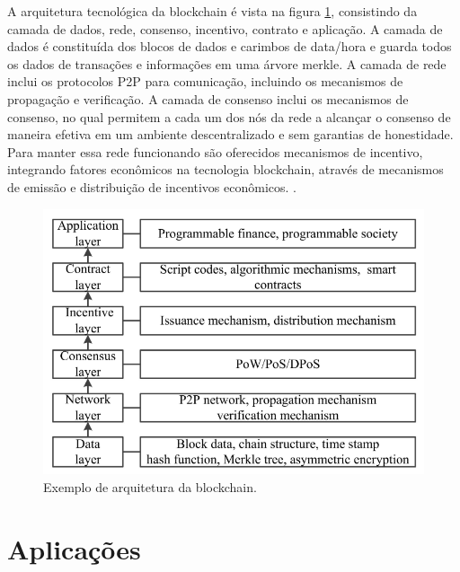 
A arquitetura tecnológica da blockchain é vista na figura \ref{fig:blockchain-architecture}, consistindo da camada de dados, rede, consenso, incentivo, contrato e aplicação. A camada de dados é constituída dos blocos de dados e carimbos de data/hora e guarda todos os dados de transações e informações em uma árvore merkle. A camada de rede inclui os protocolos P2P para comunicação, incluindo os mecanismos de propagação e verificação. A camada de consenso inclui os mecanismos de consenso, no qual permitem a cada um dos nós da rede a alcançar o consenso de maneira efetiva em um ambiente descentralizado e sem garantias de honestidade. %
Para manter essa rede funcionando são oferecidos mecanismos de incentivo, integrando fatores econômicos na tecnologia blockchain, através de mecanismos de emissão e distribuição de incentivos econômicos. 
\cite{wu_application_2018}.

\begin{figure}[!htb]
\centering
\includegraphics[width=12cm]{2-fundam/blockchain-architecture.png}
\caption{Exemplo de arquitetura da blockchain. \citep{wu_application_2018}}
\label{fig:blockchain-architecture}
\end{figure}


\section{Aplicações}

